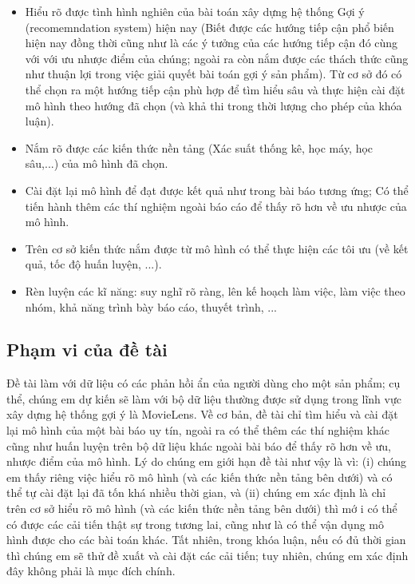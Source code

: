\documentclass{article}[14pt]
\begin{document}
{    %
\begin{itemize}
\item     Hiểu rõ được tình hình nghiên của bài toán xây dựng hệ thống Gợi ý (recomemndation system) hiện nay (Biết được các hướng tiếp cận phổ biến hiện nay đồng thời cũng như là các ý tưởng của các hướng tiếp cận đó cùng với với ưu nhược điểm của chúng; ngoài ra còn nắm được các thách thức cũng như thuận lợi trong việc giải quyết bài toán gợi ý sản phẩm).
Từ cơ sở đó có thể chọn ra một hướng tiếp cận phù hợp để tìm hiểu sâu và thực hiện cài đặt mô hình theo hướng đã chọn (và khả thi trong thời lượng cho phép của khóa luận).
\item      Nắm rõ được các kiến thức nền tảng (Xác suất thống kê, học máy, học sâu,...)  của mô hình đã chọn.
\item     Cài đặt lại mô hình  để đạt được kết quả như trong bài báo tương ứng; Có thể tiến hành thêm các thí nghiệm ngoài báo cáo để thấy rõ hơn về ưu nhược của mô hình.
\item     Trên cơ sở kiến thức nắm được từ mô hình có thể thực hiện các tôi ưu (về kết quả, tốc độ huấn luyện, ...).
\item     Rèn luyện các kĩ năng: suy nghĩ rõ ràng, lên kế hoạch làm việc, làm việc theo nhóm, khả năng trình bày báo cáo, thuyết trình, ...
\end{itemize}

    
    \subsection{Phạm vi của đề tài}
    
    Đề tài làm với dữ liệu có các phản hồi ẩn của người dùng cho một sản phẩm; cụ thể, chúng em dự kiến sẽ làm với bộ dữ liệu thường được sử  dụng trong lĩnh vực xây dựng  hệ thống gợi ý là MovieLens.
    Về cơ bản, đề tài chỉ tìm hiểu và cài đặt lại mô hình của một bài báo uy tín, ngoài ra có thể thêm các thí nghiệm khác cũng như huấn luyện trên bộ dữ liệu khác ngoài bài báo để thấy rõ hơn về ưu, nhược điểm của mô hình.
    Lý do chúng em giới hạn đề tài như vậy là vì: (i) chúng em thấy riêng việc hiểu rõ mô hình (và các kiến thức nền tảng bên dưới) và có thể tự cài đặt lại đã tốn khá nhiều thời gian, và (ii) chúng em xác định là chỉ trên cơ sở hiểu rõ mô hình (và các kiến thức nền tảng bên dưới) thì mớ i có thể có được các cải tiến thật sự trong tương lai, cũng như là có thể vận dụng mô hình được cho các bài toán khác.
    Tất nhiên, trong khóa luận, nếu có đủ thời gian thì chúng em sẽ thử đề xuất và cài đặt các cải tiến; tuy nhiên, chúng em xác định đây không phải là mục đích chính.
    
}
\end{document}
